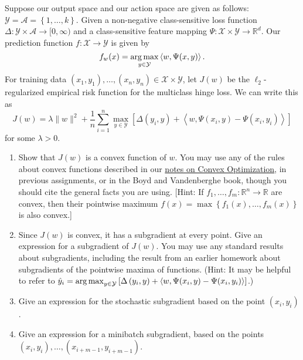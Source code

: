 \documentclass{article}
\theoremstyle{plain}
\theoremstyle{definition}
\begin{document}
Suppose our output space and our action space are given as follows:
$\mathcal{Y}=\mathcal{A}=\left\{ 1,\ldots,k\right\} $. Given a non-negative class-sensitive
loss function $\Delta:\mathcal{Y}\times\mathcal{A}\to[0,\infty)$ and a class-sensitive
feature mapping $\Psi:\mathcal{X}\times\mathcal{Y}\to\mathbb{R}^{d}$. Our prediction
function $f:\mathcal{X}\to\mathcal{Y}$ is given by
\[
f_{w}(x)=\argmax_{y\in\mathcal{Y}}\left\langle w,\Psi(x,y)\right\rangle .
\]
For training data $(x_{1},y_{1}),\ldots,(x_{n},y_{n})\in\mathcal{X}\times\mathcal{Y}$,
let $J(w)$ be the $\ell_{2}$-regularized empirical risk function
for the multiclass hinge loss. We can write this as
\[
J(w)=\lambda\|w\|^{2}+\frac{1}{n}\sum_{i=1}^{n}\max_{y\in\mathcal{Y}}\left[\Delta\left(y_{i},y\right)+\left\langle w,\Psi(x_{i},y)-\Psi(x_{i},y_{i})\right\rangle \right]
\]
for some $\lambda>0$.
\begin{enumerate}
  \setcounter{enumi}{\value{saveenum}}
\item Show that $J(w)$ is a convex function of $w$. You
may use any of the rules about convex functions described in our \href{https://davidrosenberg.github.io/mlcourse/Notes/convex-optimization.pdf}{notes on Convex Optimization},
in previous assignments, or in the Boyd and Vandenberghe book, though
you should cite the general facts you are using. {[}Hint: If $f_{1},\ldots,f_{m}:\mathbb{R}^{n}\to\mathbb{R}$
are convex, then their pointwise maximum $f(x)=\max\left\{ f_{1}(x),\ldots,f_{m}(x)\right\} $
is also convex.{]}


\item Since $J(w)$ is convex, it has a subgradient at every point. Give
an expression for a subgradient of $J(w)$. You may use any standard
results about subgradients, including the result from an earlier homework
about subgradients of the pointwise maxima of functions. (Hint: It
may be helpful to refer to $\hat{y}_{i}=\argmax_{y\in\mathcal{Y}}\left[\Delta\left(y_{i},y\right)+\left\langle w,\Psi(x_{i},y)-\Psi(x_{i},y_{i})\right\rangle \right]$.)


\item Give an expression for the stochastic subgradient based on the point
$(x_{i},y_{i})$.


\item Give an expression for a minibatch subgradient, based on the points
$(x_{i},y_{i}),\ldots,\left(x_{i+m-1},y_{i+m-1}\right)$.


\setcounter{saveenum}{\value{enumi}}
\end{enumerate}
\end{document}

